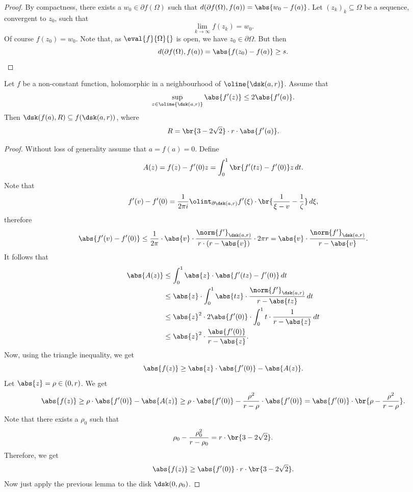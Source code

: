 \begin{proof}
By compactness, there exists a $w_0 \in \partial f(\Omega)$ such
that $d(\partial f(\Omega), f(a)) = \abs{w_0 - f(a)}$. Let
$(z_k)_k \subseteq \Omega$ be a sequence, convergent to $z_0$, such
that
\[
\lim_{k \to \infty} f(z_k) = w_0.
\]
Of course $f(z_0) = w_0$. Note that, as $\eval{f}{\Omega}{}$ is
open, we have $z_0 \in \partial \Omega$. But then
\[
d(\partial f(\Omega), f(a)) = \abs{f(z_0) - f(a)} \geq s. \qedhere
\]
\end{proof}

\begin{lema}
\label{thm_hol:lm:bloch}
Let $f$ be a non-constant function, holomorphic in a neighbourhood
of $\oline{\dsk(a, r)}$. Assume that
\[
\sup_{z \in \oline{\dsk(a,r)}} \abs{f'(z)} \leq 2 \abs{f'(a)}.
\]
Then $\dsk(f(a), R) \subseteq f(\dsk(a, r))$, where
\[
R = \br{3 - 2 \sqrt{2}} \cdot r \cdot \abs{f'(a)}.
\]
\end{lema}

\begin{proof}
Without loss of generality assume that $a = f(a) = 0$. Define
\[
A(z) = f(z) - f'(0) z = \int_0^1 \br{f'(tz) - f'(0)} z \,dt.
\]
Note that
\[
f'(v) - f'(0) =
\frac{1}{2 \pi i} \olint_{\partial \dsk(a, r)}
f'(\xi) \cdot \br{\frac{1}{\xi-v} - \frac{1}{\zeta}}\,d\xi,
\]
therefore
\[
\abs{f'(v) - f'(0)} \leq
\frac{1}{2 \pi} \cdot \abs{v} \cdot
\frac{\norm{f'}_{\dsk(a,r)}}{r \cdot (r - \abs{v})} \cdot 2 \pi r =
\abs{v} \cdot \frac{\norm{f'}_{\dsk(a,r)}}{r - \abs{v}}.
\]
It follows that
\begin{align*}
\abs{A(z)} &\leq
\int_0^1 \abs{z} \cdot \abs{f'(tz) - f'(0)}\,dt
\\
&\leq
\abs{z} \cdot \int_0^1
\abs{tz} \cdot \frac{\norm{f'}_{\dsk(a,r)}}{r - \abs{tz}}\,dt
\\
&\leq
\abs{z}^2 \cdot 2 \abs{f'(0)} \cdot \int_0^1
t \cdot \frac{1}{r - \abs{z}}\,dt
\\
&\leq
\abs{z}^2 \cdot \frac{\abs{f'(0)}}{r - \abs{z}}.
\end{align*}
Now, using the triangle inequality, we get
\[
\abs{f(z)} \geq \abs{z} \cdot \abs{f'(0)} - \abs{A(z)}.
\]
Let $\abs{z} = \rho \in (0, r)$. We get
\[
\abs{f(z)} \geq
\rho \cdot \abs{f'(0)} - \abs{A(z)} \geq
\rho \cdot \abs{f'(0)} -
\frac{\rho^2}{r - \rho} \cdot \abs{f'(0)} =
\abs{f'(0)} \cdot \br{\rho - \frac{\rho^2}{r - \rho}}.
\]
Note that there exists a $\rho_0$ such that
\[
\rho_0 - \frac{\rho_0^2}{r - \rho_0} =
r \cdot \br{3 - 2 \sqrt{2}}.
\]
Therefore, we get
\[
\abs{f(z)} \geq \abs{f'(0)} \cdot r \cdot \br{3 - 2 \sqrt{2}}.
\]
Now just apply the previous lemma to the disk $\dsk(0, \rho_0)$.
\end{proof}

